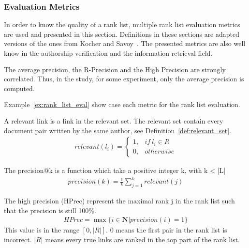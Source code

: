 \subsubsection{Evaluation Metrics \label{sec:rl_eval}}

In order to know the quality of a rank list, multiple rank list evaluation metrics are used and presented in this section.
Definitions in these sections are adapted versions of the ones from Kocher and Savoy~\cite{kocher_linking}.
The presented metrics are also well know in the authorship verification and the information retrieval field.

The average precision, the R-Precision and the High Precision are strongly correlated.
Thus, in the study, for some experiment, only the average precision is computed.

Example~\ref{ex:rank_list_eval} show case each metric for the rank list evaluation.

\begin{definition}
  A relevant link is a link in the relevant set.
  The relevant set contain every document pair written by the same author, see Definition~\ref{def:relevant_set}.
  \begin{gather*}
    relevant(l_i) =
    \begin{cases}
      1, & if\ l_i \in R \\
      0, & otherwise
    \end{cases}
  \end{gather*}
\end{definition}

\begin{definition}
  The precision@k is a function which take a positive integer k, with k < |L|
  \begin{gather*}
    precision(k) = \frac{1}{k} \sum_{j=1}^{k} relevant(j)
  \end{gather*}
\end{definition}

\begin{definition}
  The high precision (HPrec) represent the maximal rank j in the rank list such that the precision is still 100\%.
  \begin{gather*}
    HPrec = \max\{i \in \mathbf{N} | precision(i) = 1\}
  \end{gather*}
  This value is in the range $\left[0, |R|\right]$.
  $0$ means the first pair in the rank list is incorrect.
  $|R|$ means every true links are ranked in the top part of the rank list.
\end{definition}

